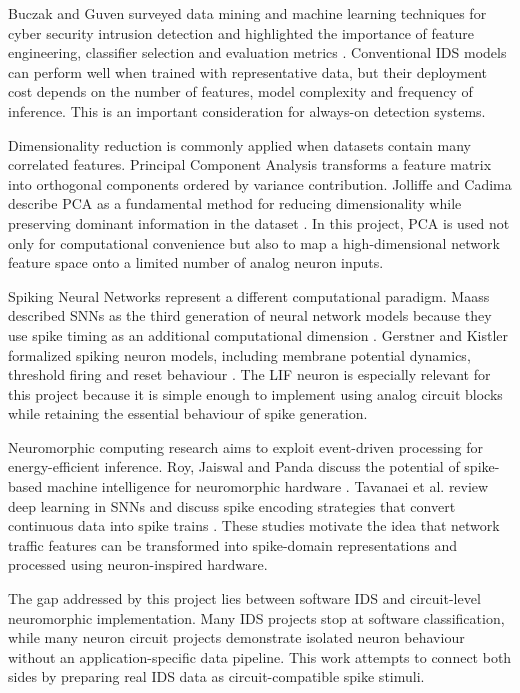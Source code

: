Buczak and Guven surveyed data mining and machine learning techniques for cyber security intrusion detection and highlighted the importance of feature engineering, classifier selection and evaluation metrics \cite{Buczak2016}. Conventional IDS models can perform well when trained with representative data, but their deployment cost depends on the number of features, model complexity and frequency of inference. This is an important consideration for always-on detection systems.

Dimensionality reduction is commonly applied when datasets contain many correlated features. Principal Component Analysis transforms a feature matrix into orthogonal components ordered by variance contribution. Jolliffe and Cadima describe PCA as a fundamental method for reducing dimensionality while preserving dominant information in the dataset \cite{Jolliffe2016}. In this project, PCA is used not only for computational convenience but also to map a high-dimensional network feature space onto a limited number of analog neuron inputs.

Spiking Neural Networks represent a different computational paradigm. Maass described SNNs as the third generation of neural network models because they use spike timing as an additional computational dimension \cite{Maass1997}. Gerstner and Kistler formalized spiking neuron models, including membrane potential dynamics, threshold firing and reset behaviour \cite{Gerstner2002}. The LIF neuron is especially relevant for this project because it is simple enough to implement using analog circuit blocks while retaining the essential behaviour of spike generation.

Neuromorphic computing research aims to exploit event-driven processing for energy-efficient inference. Roy, Jaiswal and Panda discuss the potential of spike-based machine intelligence for neuromorphic hardware \cite{Roy2019}. Tavanaei et al. review deep learning in SNNs and discuss spike encoding strategies that convert continuous data into spike trains \cite{Tavanaei2019}. These studies motivate the idea that network traffic features can be transformed into spike-domain representations and processed using neuron-inspired hardware.

The gap addressed by this project lies between software IDS and circuit-level neuromorphic implementation. Many IDS projects stop at software classification, while many neuron circuit projects demonstrate isolated neuron behaviour without an application-specific data pipeline. This work attempts to connect both sides by preparing real IDS data as circuit-compatible spike stimuli.


